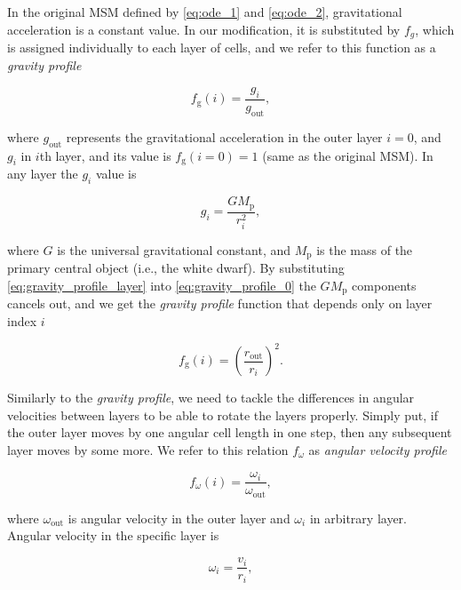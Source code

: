 In the original MSM defined by \eqref{eq:ode_1} and \eqref{eq:ode_2}, gravitational acceleration is a constant value. In our modification, it is substituted by $f_g$, which is assigned individually to each layer of cells, and we refer to this function as a \emph{gravity profile}

\begin{equation}
    f_{\text{g}}(i) = \frac{g_i}{g_{\text{out}}},
    \label{eq:gravity_profile_0}
\end{equation}

where $g_{\text{out}}$ represents the gravitational acceleration in the outer layer $i=0$, and $g_i$ in $i$th layer, and its value is ${f_{\textrm{g}}(i=0) = 1}$ (same as the original MSM). In any layer the $g_i$ value is 

\begin{equation}
    g_i = \frac{GM_{\text{p}}}{r_i^2},
    \label{eq:gravity_profile_layer}
\end{equation}

where $G$ is the universal gravitational constant, and $M_{\mathrm{p}}$ is the mass of the primary central object (i.e., the white dwarf). By substituting \eqref{eq:gravity_profile_layer} into \eqref{eq:gravity_profile_0} the $GM_{\text{p}}$ components cancels out, and we get the \emph{gravity profile} function that depends only on layer index $i$

\begin{equation}
	f_{\text{g}}(i) = \left( \frac{r_{\text{out}}}{r_i} \right)^2.
	\label{eq:gravity_profile_final}
\end{equation}

Similarly to the \emph{gravity profile}, we need to tackle the differences in angular velocities between layers to be able to rotate the layers properly. Simply put, if the outer layer moves by one angular cell length in one step, then any subsequent layer moves by some more. We refer to this relation $f_{\omega}$ as \emph{angular velocity profile}

\begin{equation}
    f_{\omega}(i) = \frac{\omega_i}{\omega_\text{out}},
    \label{eq:av_profile_0}
\end{equation}

where $\omega_{\text{out}}$ is angular velocity in the outer layer and $\omega_i$ in arbitrary layer. Angular velocity in the specific layer is

\begin{equation}
    \omega_i = \frac{v_i}{r_i},
    \label{eq:omega_layer}
\end{equation}

